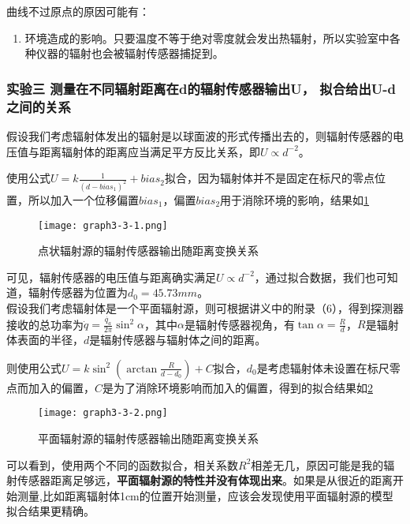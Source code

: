 \documentclass[dvipsnames, svgnames,a4paper,11pt]{article}
\begin{document}
	曲线不过原点的原因可能有：
	\begin{enumerate}
		\item 环境造成的影响。只要温度不等于绝对零度就会发出热辐射，所以实验室中各种仪器的辐射也会被辐射传感器捕捉到。
		

	\end{enumerate}
	





	\subsubsection{实验三 \quad 测量在不同辐射距离在d的辐射传感器输出U， 拟合给出U-d之间的关系}

	假设我们考虑辐射体发出的辐射是以球面波的形式传播出去的，则辐射传感器的电压值与距离辐射体的距离应当满足平方反比关系，即$U\propto d^{-2}$。

	使用公式$U=k\frac{1}{(d-bias_1)^{2}}+bias_2$拟合，因为辐射体并不是固定在标尺的零点位置，所以加入一个位移偏置$bias_1$，偏置$bias_2$用于消除环境的影响，结果如\cref{fig:graph3-3-1}

	\begin{figure}[htbp]
		\centering
		\texttt{[image: graph3-3-1.png]}
		\caption{点状辐射源的辐射传感器输出随距离变换关系}
		\label{fig:graph3-3-1}
	\end{figure}

	可见，辐射传感器的电压值与距离确实满足$U\propto d^{-2}$，通过拟合数据，我们也可知道，辐射传感器为位置为$d_0=45.73mm$。\\


	假设我们考虑辐射体是一个平面辐射源，则可根据讲义中的附录（6），得到探测器接收的总功率为$\dot{q}=\frac{\dot{q_a}}{2\pi}\sin^2\alpha$，其中$\alpha$是辐射传感器视角，有$\tan\alpha=\frac{R}{d}$，$R$是辐射体表面的半径，$d$是辐射传感器与辐射体之间的距离。

	则使用公式$U=k\sin^2(\arctan\frac{R}{d-d_0})+C$拟合，$d_0$是考虑辐射体未设置在标尺零点而加入的偏置，$C$是为了消除环境影响而加入的偏置，得到的拟合结果如\cref{fig:graph3-3-2}

	\begin{figure}[htbp]
		\centering
		\texttt{[image: graph3-3-2.png]}
		\caption{平面辐射源的辐射传感器输出随距离变换关系}
		\label{fig:graph3-3-2}
	\end{figure}

	可以看到，使用两个不同的函数拟合，相关系数$R^2$相差无几，原因可能是我的辐射传感器距离足够远，\textbf{平面辐射源的特性并没有体现出来}。如果是从很近的距离开始测量,比如距离辐射体1cm的位置开始测量，应该会发现使用平面辐射源的模型拟合结果更精确。
\end{document}
